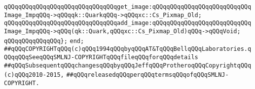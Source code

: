 \newline
\verb|qQQqqQQqqQQqqQQqqQQqqQQqqQQqqQQqget_image:qQQqqQQqqQQqqQQqqQQqqQQqqQQqImage_ImpqQQq->qQQqqk::QuarkqQQq->qQQqxc::Cs_Pixmap_Old;|\newline
\newline
\verb|qQQqqQQqqQQqqQQqqQQqqQQqqQQqqQQqadd_image:qQQqqQQqqQQqqQQqqQQqqQQqqQQqImage_ImpqQQq->qQQq(qk::Quark,qQQqxc::Cs_Pixmap_Old)qQQq->qQQqVoid;|\newline
\verb|qQQqqQQqqQQqqQQq};|\newline
\newline
\verb|end;|\newline
\newline
\newline
\verb|##qQQqCOPYRIGHTqQQq(c)qQQq1994qQQqbyqQQqAT&TqQQqBellqQQqLaboratories.qQQqqQQqSeeqQQqSMLNJ-COPYRIGHTqQQqfileqQQqforqQQqdetails|\newline
\verb|##qQQqSubsequentqQQqchangesqQQqbyqQQqJeffqQQqProtheroqQQqCopyrightqQQq(c)qQQq2010-2015,|\newline
\verb|##qQQqreleasedqQQqperqQQqtermsqQQqofqQQqSMLNJ-COPYRIGHT.|\newline

